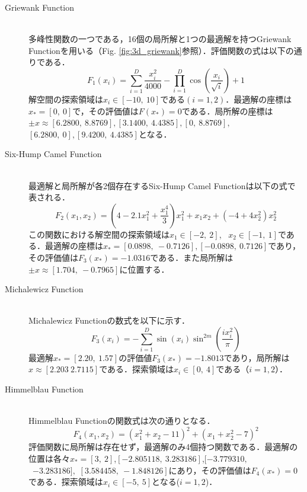 \documentclass{jarticle}
\begin{document}
\begin{description}
\item[Griewank Function]\mbox{}\\

多峰性関数の一つである，16個の局所解と1つの最適解を持つGriewank Function\cite{f1f3}を用いる（Fig. \ref{fig:3d_griewank}参照）．評価関数の式は以下の通りである．
\begin{equation}
F_1(x_i)=\sum_{i=1}^D \frac{x_i^2}{4000}- \prod_{i=1}^D \cos( \frac{x_i}{\sqrt{i}})+1
\end{equation}
解空間の探索領域は$x_i \in [-10, \ 10]$である$(i=1,2)$．最適解の座標は$x_*=[0, \ 0]$で，その評価値は$F(x_*)=0$である．局所解の座標は$\pm x \approx [6.2800, \ 8.8769], [3.1400, \ 4.4385], [0, \ 8.8769],$ \\ $ [6.2800, \ 0], [9.4200, \ 4.4385]$となる．


\item[Six-Hump Camel Function]\mbox{}\\
最適解と局所解が各2個存在するSix-Hump Camel Function\cite{f1f3}は以下の式で表される．
\begin{equation}
\label{eq:sixhump}
F_2(x_1,x_2)=(4-2.1x_1^2+ \frac{x_1^4}{3})x_1^2+x_1x_2+(-4+4x_2^2)x_2^2
\end{equation}
この関数における解空間の探索領域は$x_1 \in [-2, \ 2]$, \ $x_2 \in [-1, \ 1]$である．最適解の座標は$x_*=[0.0898, \ -0.7126], [-0.0898, \ 0.7126]$であり，その評価値は$F_3(x_*)=-1.0316$である．また局所解は$\pm x \approx [1.704, \ -0.7965]$に位置する．

\item[Michalewicz Function]\mbox{}\\
Michalewicz Function\cite{f1f3}の数式を以下に示す．
\begin{equation}
\label{eq:michalewicz}
F_3(x_i)=- \sum_{i=1}^D \sin(x_i)\sin^{2m}(\frac{ix_i^2}{\pi})
\end{equation}
最適解$x_*=[2.20, \ 1.57]$の評価値$F_3(x_*)=-1.8013$であり，局所解は$x \approx [2.203 \ 2.7115]$である．探索領域は$x_i \in [0, \ 4]$である（$i=1,2$）．

\item[Himmelblau Function]\mbox{}\\
Himmelblau Function\cite{f4}の関数式は次の通りとなる．
\begin{equation}
\label{eq:himmelblau}
F_4(x_1,x_2)=(x_1^2+x_2-11)^2+(x_1+x_2^2-7)^2
\end{equation}
評価関数に局所解は存在せず，最適解のみ4個持つ関数である．最適解の位置は各々$x_*=[3, \ 2]$,$[-2.805118, \ 3.283186]$,$[-3.779310,$ \\ \ $-3.283186],$ $[3.584458, \ -1.848126]$にあり，その評価値は$F_4(x_*)=0$である．探索領域は$x_i \in [-5, \ 5]$となる($i=1,2$)．

\end{description}
\end{document}
